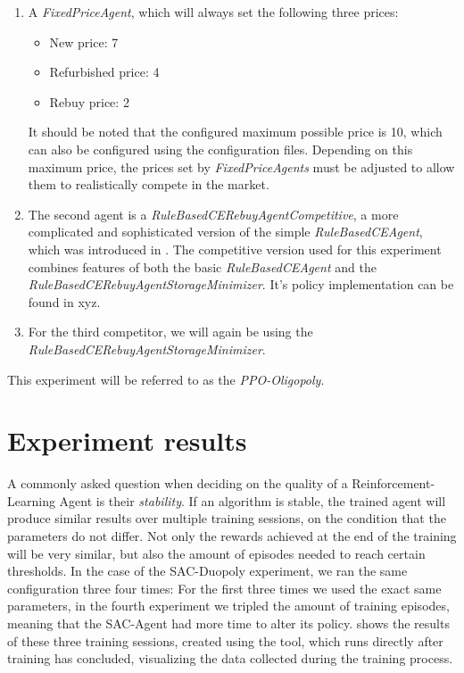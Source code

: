 \begin{enumerate}
	\item A \emph{FixedPriceAgent}, which will always set the following three prices:
	      \begin{itemize}
		      \item New price: 7
		      \item Refurbished price: 4
		      \item Rebuy price: 2
	      \end{itemize}
	      It should be noted that the configured maximum possible price is 10, which can also be configured using the configuration files. Depending on this maximum price, the prices set by \emph{FixedPriceAgents} must be adjusted to allow them to realistically compete in the market.
	\item The second agent is a \emph{RuleBasedCERebuyAgentCompetitive}, a more complicated and sophisticated version of the simple \emph{RuleBasedCEAgent}, which was introduced in . The competitive version used for this experiment combines features of both the basic \emph{RuleBasedCEAgent} and the \emph{RuleBasedCERebuyAgentStorageMinimizer}. It's policy implementation can be found in xyz.
	\item For the third competitor, we will again be using the \emph{RuleBasedCERebuyAgentStorageMinimizer}.
\end{enumerate}

This experiment will be referred to as the \emph{PPO-Oligopoly}.

\section*{Experiment results}

A commonly asked question when deciding on the quality of a Reinforcement-Learning Agent is their \emph{stability}. If an algorithm is stable, the trained agent will produce similar results over multiple training sessions, on the condition that the parameters do not differ. Not only the rewards achieved at the end of the training will be very similar, but also the amount of episodes needed to reach certain thresholds. In the case of the SAC-Duopoly experiment, we ran the same configuration three four times: For the first three times we used the exact same parameters, in the fourth experiment we tripled the amount of training episodes, meaning that the SAC-Agent had more time to alter its policy.  shows the results of these three training sessions, created using the  tool, which runs directly after training has concluded, visualizing the data collected during the training process.

